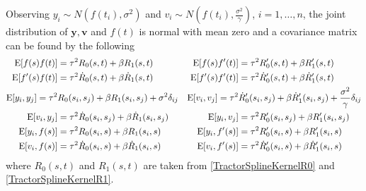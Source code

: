 Observing $y_i\sim N\left(f (t_i),\sigma^2\right)$ and $v_i\sim N\left(f (t_i),\frac{\sigma^2}{\gamma}\right)$, $i=1,\ldots,n$, the joint distribution of $\mathbf{y},\mathbf{v}$ and $f(t)$ is normal with mean zero and a covariance matrix can be found by the following 
\small
\begin{equation}
\begin{aligned}
\mathrm{E}\lbrack f(s)f (t)\rbrack &=\tau^2R_0(s,t)+\beta R_1(s,t) & \mathrm{E} \lbrack f(s)f '(t)\rbrack&=\tau^2R_0'(s,t)+\beta R_1'(s,t) \\
\mathrm{E}\lbrack f '(s)f (t)\rbrack&=\tau^2\dot{R}_0(s,t)+\beta\dot{R}_1(s,t) & \mathrm{E}\lbrack f '(s)f '(t)\rbrack&=\tau^2\dot{R}'_0(s,t)+\beta\dot{R}'_1(s,t) \\
\footnotesize \mathrm{E}\lbrack y_i,y_j\rbrack=\tau^2 & R_0(s_i,s_j)+\beta R_1(s_i,s_j)+\sigma^2\delta_{ij}   & 
\mathrm{E} \lbrack v_i,v_j\rbrack=\tau^2&\dot{R}'_0(s_i,s_j)+\beta\dot{R}'_1(s_i,s_j) +\frac{\sigma^2}{\gamma}\delta_{ij} \\ 
\normalsize
\mathrm{E}\lbrack v_i,y_j\rbrack&=\tau^2\dot{R}_0(s_i,s_j)+\beta \dot{R}_1(s_i,s_j) &
\mathrm{E}\lbrack y_i,v_j\rbrack&=\tau^2R_0'(s_i,s_j)+\beta R_1'(s_i,s_j)\\
\mathrm{E}\lbrack y_i,f(s)\rbrack&=\tau^2 R_0(s_i,s)+\beta R_1(s_i,s)  & \mathrm{E}\lbrack y_i,f '(s)\rbrack&=\tau^2 R'_0(s_i,s)+\beta R'_1(s_i,s)  \\
\mathrm{E}\lbrack v_i,f(s)\rbrack&=\tau^2 \dot{R}_0(s_i,s)+\beta \dot{R}_1(s_i,s) & \mathrm{E}\lbrack v_i,f '(s)\rbrack&=\tau^2\dot{R}'_0(s_i,s)+\beta \dot{R}'_1(s_i,s)
\end{aligned}
\end{equation}
\normalsize where $R_0(s,t)$ and $R_1(s,t)$ are taken from \eqref{TractorSplineKernelR0} and \eqref{TractorSplineKernelR1}. %

